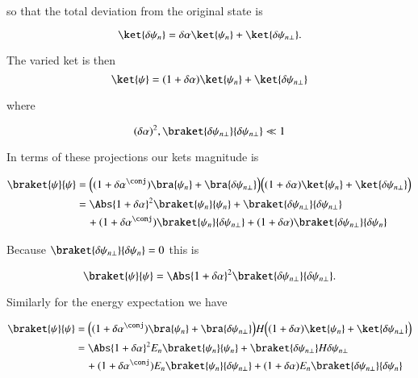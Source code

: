 so that the total deviation from the original state is

\begin{equation}\label{eqn:qmTwoL3:50}
\ket{\delta \psi_n} 
= \delta \alpha \ket{\psi_n} 
+ \ket{\delta \psi_{n \perp}} .
\end{equation}

The varied ket is then
\begin{equation}\label{eqn:qmTwoL3:70}
\ket{\psi} 
= (1 + \delta \alpha )\ket{\psi_n} + \ket{\delta \psi_{n \perp}} 
\end{equation}

where

\begin{equation}\label{eqn:qmTwoL3:90}
(\delta \alpha)^2, \braket{\delta \psi_{n \perp}}{\delta \psi_{n \perp}}  \ll 1
\end{equation}

In terms of these projections our kets magnitude is

\begin{align*}
\braket{\psi}{\psi} 
&= 
\Bigl(
(1 + {\delta \alpha}^\conj )\bra{\psi_n} + \bra{\delta \psi_{n \perp}} 
\Bigr)
\Bigl(
(1 + \delta \alpha )\ket{\psi_n} + \ket{\delta \psi_{n \perp}} 
\Bigr) \\
&=
\Abs{1 + \delta \alpha}^2 \braket{\psi_n}{\psi_n}
+ 
\braket{\delta \psi_{n \perp}}{\delta \psi_{n \perp}}  \\
&\quad +
(1 + {\delta \alpha}^\conj )\braket{\psi_n}{\delta \psi_{n \perp}} 
+
(1 + \delta \alpha )\braket{\delta \psi_{n \perp}}{\delta \psi_n} 
\end{align*}

Because $\braket{\delta \psi_{n \perp}}{\delta \psi_n} = 0$ this is

\begin{equation}\label{eqn:qmTwoL3:110}
\braket{\psi}{\psi}
= 
\Abs{1 + \delta \alpha }^2
\braket{\delta \psi_{n \perp}}{\delta \psi_{n \perp}}.
\end{equation}

Similarly for the energy expectation we have

\begin{align*}
\braket{\psi}{\psi} 
&= 
\Bigl(
(1 + {\delta \alpha}^\conj )\bra{\psi_n} + \bra{\delta \psi_{n \perp}} 
\Bigr)
H
\Bigl(
(1 + \delta \alpha )\ket{\psi_n} + \ket{\delta \psi_{n \perp}} 
\Bigr) \\
&=
\Abs{1 + \delta \alpha}^2 E_n \braket{\psi_n}{\psi_n}
+ 
\braket{\delta \psi_{n \perp}} H {\delta \psi_{n \perp}}  \\
&\quad + 
(1 + {\delta \alpha}^\conj ) E_n \braket{\psi_n}{\delta \psi_{n \perp}} 
+
(1 + \delta \alpha ) E_n \braket{\delta \psi_{n \perp}}{\delta \psi_n} 
\end{align*}

